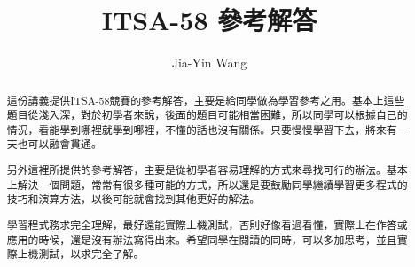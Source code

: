 \documentclass[12pt,a4paper]{article}
\begin{document}
\title{ITSA-58 參考解答}
\author{Jia-Yin Wang}
\maketitle

\begin{abstract}
這份講義提供ITSA-58競賽的參考解答，主要是給同學做為學習參考之用。基本上這些題目從淺入深，對於初學者來說，後面的題目可能相當困難，所以同學可以根據自己的情況，看能學到哪裡就學到哪裡，不懂的話也沒有關係。只要慢慢學習下去，將來有一天也可以融會貫通。

另外這裡所提供的參考解答，主要是從初學者容易理解的方式來尋找可行的辦法。基本上解決一個問題，常常有很多種可能的方式，所以還是要鼓勵同學繼續學習更多程式的技巧和演算方法，以後可能就會找到其他更好的解法。

學習程式務求完全理解，最好還能實際上機測試，否則好像看過看懂，實際上在作答或應用的時候，還是沒有辦法寫得出來。希望同學在閱讀的同時，可以多加思考，並且實際上機測試，以求完全了解。
\end{abstract}
\newpage

\newpage

\newpage

\newpage

\newpage

\end{document}
